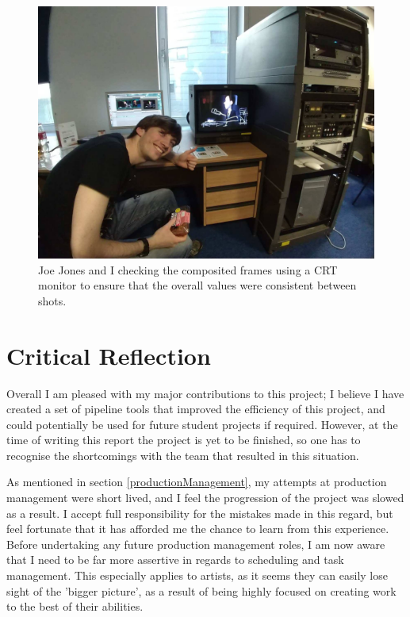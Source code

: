 \documentclass[11pt]{article}
\begin{document}
\begin{figure}[htbp]\centering
	\includegraphics[width=1.0\linewidth]{images/joe_with_crt.jpg}
	\caption{\label{figure:joewithcrt} Joe Jones and I checking the composited frames using a CRT monitor to ensure that the overall values were consistent between shots.}
\end{figure}

\newpage

\section{Critical Reflection}

Overall I am pleased with my major contributions to this project; I believe I have created a set of pipeline tools that improved the efficiency of this project, and could potentially be used for future student projects if required. However, at the time of writing this report the project is yet to be finished, so one has to recognise the shortcomings with the team that resulted in this situation.

As mentioned in section \ref{productionManagement}, my attempts at production management were short lived, and I feel the progression of the project was slowed as a result. I accept full responsibility for the mistakes made in this regard, but feel fortunate that it has afforded me the chance to learn from this experience. Before undertaking any future production management roles, I am now aware that I need to be far more assertive in regards to scheduling and task management. This especially applies to artists, as it seems they can easily lose sight of the 'bigger picture', as a result of being highly focused on creating work to the best of their abilities.
\end{document}
